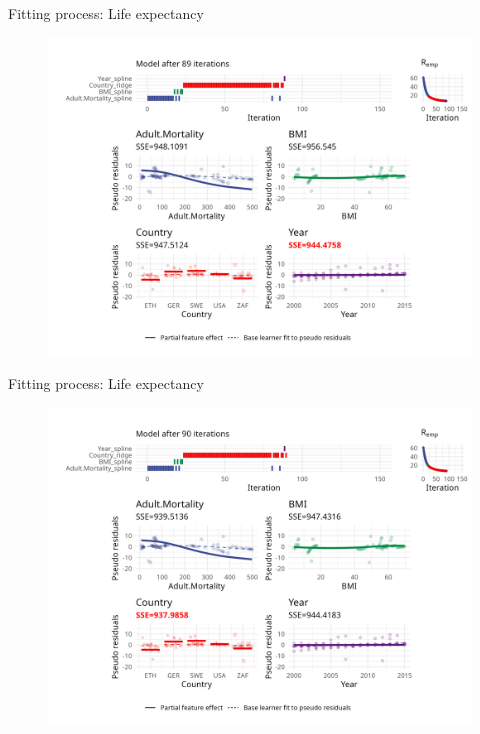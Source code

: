 \begin{frame}{Fitting process: Life expectancy}
	\begin{figure}
		\centering
		\includegraphics[width=\textwidth]{figures/cwb-anim/fig-iter-0089.png}
	\end{figure}
	\addtocounter{framenumber}{-1}
\end{frame}


\begin{frame}{Fitting process: Life expectancy}
	\begin{figure}
		\centering
		\includegraphics[width=\textwidth]{figures/cwb-anim/fig-iter-0090.png}
	\end{figure}
	\addtocounter{framenumber}{-1}
\end{frame}


